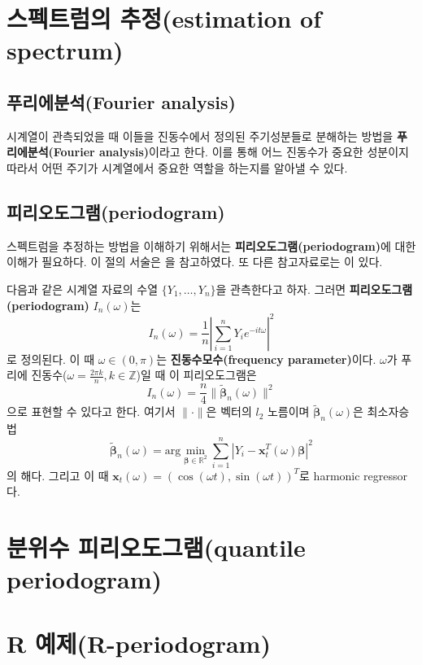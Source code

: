 \documentclass[b5paper,]{scrbook}
\theoremstyle{plain}
\theoremstyle{definition}
\numberwithin{equation}{section}
\begin{document}
\section{스펙트럼의 추정(estimation of
spectrum)}\label{-estimation-of-spectrum}

\subsection{푸리에분석(Fourier analysis)}\label{fourier-analysis}

시계열이 관측되었을 때 이들을 진동수에서 정의된 주기성분들로 분해하는
방법을 \textbf{푸리에분석(Fourier analysis)}이라고 한다. 이를 통해 어느
진동수가 중요한 성분이지 따라서 어떤 주기가 시계열에서 중요한 역할을
하는지를 알아낼 수 있다.

\subsection{피리오도그램(periodogram)}\label{periodogram-1}

스펙트럼을 추정하는 방법을 이해하기 위해서는
\textbf{피리오도그램(periodogram)}에 대한 이해가 필요하다. 이 절의
서술은 \citep{Lim2013}을 참고하였다. 또 다른 참고자료로는
\citep{Shumway2010}이 있다.

다음과 같은 시계열 자료의 수열 \(\{Y_{1}, \ldots, Y_{n}\}\)을 관측한다고
하자. 그러면 \textbf{피리오도그램(periodogram)} \(I_{n}(\omega)\)는
\[I_{n}(\omega)=\frac{1}{n}| \sum_{i=1}^{n}Y_{i}e^{-it\omega}|^{2}\] 로
정의된다. 이 때 \(\omega\in (0,\pi)\)는 \textbf{진동수모수(frequency
parameter)}이다. \(\omega\)가 푸리에
진동수(\(\omega=\frac{2\pi k}{n}, k\in\mathbb{Z}\))일 때 이
피리오도그램은
\[I_{n}(\omega)=\frac{n}{4}\| \tilde{\boldsymbol{\beta}}_{n}(\omega)\|^{2}\]
으로 표현할 수 있다고 한다\citep{Li2008}. 여기서 \(\| \cdot \|\)은
벡터의 \(l_{2}\) 노름이며 \(\tilde{\boldsymbol{\beta}}_{n}(\omega)\)은
최소자승법
\[\tilde{\boldsymbol{\beta}}_{n}(\omega)=\text{arg}\min_{\boldsymbol{\beta}\in\mathbb{R}^{2}}\sum_{i=1}^{n}| Y_{i}-\mathbf{x}_{t}^{T}(\omega)\boldsymbol{\beta}|^{2}\]
의 해다. 그리고 이 때
\(\mathbf{x}_{t}(\omega)=(\cos(\omega t), \sin (\omega t))^{T}\)로
harmonic regressor다.

\section{분위수 피리오도그램(quantile
periodogram)}\label{-quantile-periodogram}

\section{R 예제(R-periodogram)}\label{r-r-periodogram}
\end{document}
